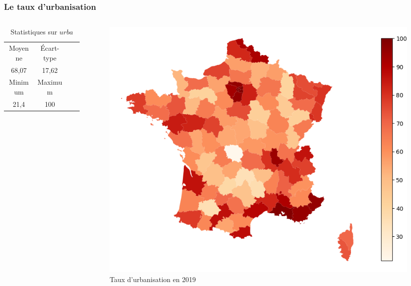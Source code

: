 \documentclass{beamer}
\begin{document}
\begin{frame}
    \frametitle{Le taux d'urbanisation}
    \begin{columns}
    
    \begin{column}{0.5\textwidth}
    \begin{table}[H]
        \caption*{Statistiques sur $urba$}
        \begin{tabular}{cccc}
        \toprule
        Moyenne  & Écart-type   \\ 
        68,07 & 17,62   \\
        \midrule
        Minimum & Maximum   \\ 
        21,4    & 100      \\
        \bottomrule
        \end{tabular}
    \end{table}
    \end{column}

    \begin{column}{0.5\textwidth}
        \centering
        \begin{figure}
            \includegraphics[width=\textwidth]{urba.png}
            \caption{Taux d'urbanisation en 2019}
        \end{figure}
    \end{column}
    
    \end{columns}
\end{frame}
\end{document}
